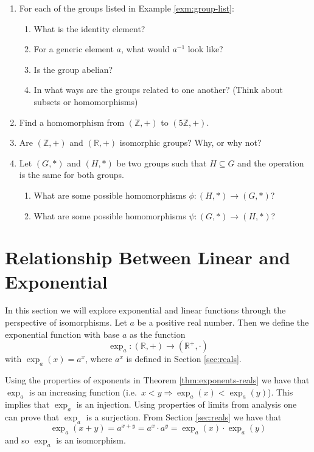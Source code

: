 \documentclass[
]{book}
\theoremstyle{definition}
\theoremstyle{definition}
\theoremstyle{definition}
\theoremstyle{remark}
\begin{document}
\begin{enumerate}
\def\labelenumi{\arabic{enumi}.}
\item
  For each of the groups listed in Example \ref{exm:group-list}:

  \begin{enumerate}
  \def\labelenumii{\alph{enumii}.}
  \item
    What is the identity element?
  \item
    For a generic element \(a\), what would \(a^{-1}\) look like?
  \item
    Is the group abelian?
  \item
    In what ways are the groups related to one another? (Think about subsets or homomorphisms)
  \end{enumerate}
\item
  Find a homomorphism from \(\left(\mathbb{Z}, +\right)\) to \(\left(5\mathbb{Z}, +\right)\).
\item
  Are \((\mathbb{Z},+)\) and \((\mathbb{R},+)\) isomorphic groups? Why, or why not?
\item
  Let \((G,*)\) and \((H,*)\) be two groups such that \(H\subseteq G\) and the operation is the same for both groups.

  \begin{enumerate}
  \def\labelenumii{\alph{enumii}.}
  \item
    What are some possible homomorphisms \(\phi:(H,*)\rightarrow (G,*)\)?
  \item
    What are some possible homomorphisms \(\psi:(G,*) \rightarrow (H,*)\)?
  \end{enumerate}
\end{enumerate}

\hypertarget{sec:linear-exponential}{%
\section{Relationship Between Linear and Exponential}\label{sec:linear-exponential}}

In this section we will explore exponential and linear functions through the perspective of isomorphisms. Let \(a\) be a positive real number. Then we define the exponential function with base \(a\) as the function \[\exp_a: (\mathbb{R},+) \rightarrow (\mathbb{R}^+,\cdot)\] with \(\exp_a{(x)}= a^x\), where \(a^x\) is defined in Section \ref{sec:reals}.

Using the properties of exponents in Theorem \ref{thm:exponents-reals} we have that \(\exp_a\) is an increasing function (i.e.~\(x<y \Rightarrow \exp_a{(x)}<\exp_a{(y)}\)). This implies that \(\exp_a\) is an injection. Using properties of limits from analysis one can prove that \(\exp_a\) is a surjection. From Section \ref{sec:reals} we have that \[\exp_a{(x+y)} = a^{x+y} = a^x \cdot a^y = \exp_a{(x)}\cdot \exp_a{(y)}\] and so \(\exp_a\) is an isomorphism.
\end{document}

